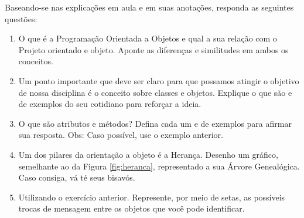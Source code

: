   Baseando-se nas explicações em aula e em suas anotações, responda as seguintes questões:

  \begin{enumerate}
    \item O que é a Programação Orientada a Objetos e qual a sua relação com o Projeto orientado e objeto. Aponte as diferenças e similitudes em ambos os conceitos.
    \item   Um ponto importante que deve ser claro para que possamos atingir o objetivo de nossa disciplina é o conceito sobre classes e objetos. Explique o que são e de exemplos do seu cotidiano para reforçar a ideia.
    \item O que são atributos e métodos? Defina cada um e de exemplos para afirmar sua resposta. Obs: Caso possível, use o exemplo anterior.
    \item Um dos pilares da orientação a objeto é a Herança. Desenho um gráfico, semelhante ao da Figura \ref{fig:heranca}, representado a sua Árvore Genealógica. Caso consiga, vá té seus bisavós. 
    \item Utilizando o exercício anterior. Represente, por meio de setas, as possíveis trocas de mensagem entre os objetos que você pode identificar. 
  \end{enumerate}
  



  

  



